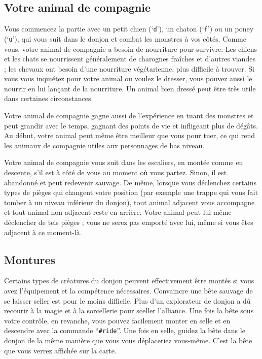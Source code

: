 \documentclass[titlepage]{article}
\begin{document}
\subsection*{Votre animal de compagnie}

Vous commencez la partie avec un petit chien (`\texttt{d}'), un chaton (`\texttt{f}')
ou un poney (`\texttt{u}'), qui vous suit
dans le donjon et combat les monstres à vos côtés.
Comme vous, votre animal de compagnie a besoin de nourriture pour survivre.
Les chiens et les chats se nourrissent généralement de charognes fraîches et
d'autres viandes ; les chevaux ont besoin d'une nourriture végétarienne, plus
difficile à trouver.
Si vous vous inquiétez pour votre animal ou voulez le dresser, vous
pouvez aussi le nourrir en lui lançant de la nourriture.
Un animal bien dressé peut être très utile dans certaines circonstances.

Votre animal de compagnie gagne aussi de l'expérience en tuant des monstres et
peut grandir avec le temps, gagnant des points de vie et infligeant plus de dégâts.
Au début, votre animal peut même être meilleur que vous pour tuer, ce qui rend les
animaux de compagnie utiles aux personnages de bas niveau.

Votre animal de compagnie vous suit dans les escaliers, en montée comme en
descente, s'il est à côté de vous au moment où vous partez.  Sinon, il est
abandonné et peut redevenir sauvage.  De même, lorsque vous déclenchez certains
types de pièges qui changent votre position (par exemple une trappe qui vous fait
tomber à un niveau inférieur du donjon), tout animal adjacent vous accompagne et
tout animal non adjacent reste en arrière.  Votre animal peut lui-même déclencher
de tels pièges ; vous ne serez pas emporté avec lui, même si vous êtes adjacent
à ce moment-là.

\subsection*{Montures}

Certains types de créatures du donjon peuvent effectivement être montés si vous
avez l'équipement et la compétence nécessaires.  Convaincre une bête sauvage de se
laisser seller est pour le moins difficile.  Plus d'un explorateur de donjon
a dû recourir à la magie et à la sorcellerie pour sceller l'alliance.
Une fois la bête sous votre contrôle, en revanche, vous pouvez
facilement monter en selle et en descendre avec la commande ``\texttt{\#ride}''.  Une
fois en selle, guidez la bête dans le donjon de la même manière
que vous vous déplaceriez vous-même.  C'est la bête que vous verrez affichée
sur la carte.
\end{document}
